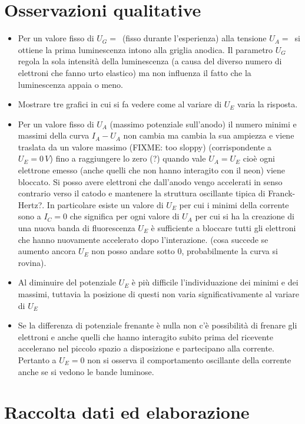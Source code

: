 \documentclass[10pt,a4paper]{article}
\begin{document}
\section{Osservazioni qualitative}
\begin{itemize}
\item Per un valore fisso di $U_G = \, $ (fisso durante l'esperienza) alla tensione $U_A = \, $ si ottiene la prima luminescenza intono alla griglia anodica. Il parametro $U_G$ regola la sola intensità della luminescenza (a causa del diverso numero di elettroni che fanno urto elastico) ma non influenza il fatto che la luminescenza appaia o meno.
\item Mostrare tre grafici in cui si fa vedere come al variare di $U_E$ varia la risposta.

\item Per un valore fisso di $U_A$ (massimo potenziale sull'anodo) il numero minimi e massimi della curva $I_A-U_A$ non cambia ma cambia la sua ampiezza e viene traslata da un valore massimo (FIXME: too sloppy) (corrispondente a $U_E = 0 \, V$) fino a raggiungere lo zero (?) quando vale $U_A = U_E$ cioè ogni elettrone emesso (anche quelli che non hanno interagito con il neon) viene bloccato. Si posso avere elettroni che dall'anodo vengo accelerati in senso contrario verso il catodo e mantenere la struttura oscillante tipica di Franck-Hertz?. In particolare esiste un valore di $U_E$ per cui i minimi della corrente sono a $I_C = 0$ che significa per ogni valore di $U_A$ per cui si ha la creazione di una nuova banda di fluorescenza $U_E$ è sufficiente a bloccare tutti gli elettroni che hanno nuovamente accelerato dopo l'interazione. (cosa succede se aumento  ancora $U_E$ non posso andare sotto 0, probabilmente la curva si rovina).
\item Al diminuire del potenziale $U_E$ è più difficile l'individuazione dei minimi e dei massimi, tuttavia la posizione di questi non varia significativamente al 
variare di $U_E$ 
\item Se la differenza di potenziale frenante è nulla non c'è possibilità di frenare gli elettroni e anche quelli che hanno interagito subito prima del ricevente accelerano nel piccolo spazio a disposizione e partecipano alla corrente. Pertanto a $U_E = 0$ non si osserva il comportamento oscillante della corrente anche se si vedono le bande luminose.
\end{itemize}
 

\section{Raccolta dati ed elaborazione}
\end{document}

